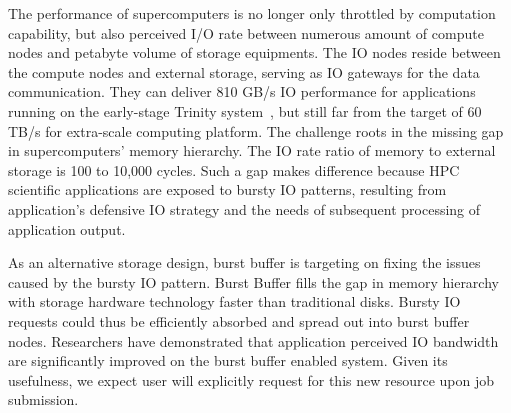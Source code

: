 The performance of supercomputers is no longer only throttled by computation capability,
but also perceived I/O rate between
numerous amount of compute nodes and 
petabyte volume of storage equipments.
The IO nodes reside between the compute nodes and external storage, 
serving as IO gateways for the data communication. 
They can deliver 810 GB/s IO performance for applications running on the early-stage Trinity system~\cite{TrinitySystem}, 
but still far from the target of 60 TB/s
for extra-scale computing platform\cite{Shalf:HPCCS:2010}.
The challenge roots in the missing gap in supercomputers' memory hierarchy.
The IO rate ratio of memory to external storage 
is 100 to 10,000 cycles\cite{TrinitySystem}.
Such a gap makes difference because HPC scientific applications are exposed to
bursty IO patterns\cite{Carns:MSST:2011, Kim:PDSW:2010},
resulting from application's
defensive IO strategy\cite{Latham:CSD:2012, Naik:ICPPW:2009, Dennis:CUG:2009}
and the needs of subsequent processing of application output.


As an alternative storage design, burst buffer\cite{Bent:HBP:2011, Grider:EXA:2010}
is targeting on fixing the issues caused by the bursty IO pattern.
Burst Buffer fills the gap in memory hierarchy with storage hardware technology
faster than traditional disks.
Bursty IO requests could thus be efficiently absorbed and spread out
into burst buffer nodes.
Researchers\cite{Liu:MSST:2012} have demonstrated that application perceived IO
bandwidth are significantly improved on the burst buffer enabled system.
Given its usefulness, we expect user will explicitly request for
this new resource upon job submission.



